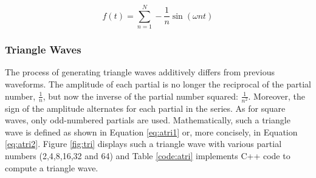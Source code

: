\documentclass[12pt,twoside]{report}
\begin{document}
\begin{equation}
  f(t) = \sum\limits_{n=1}^N -\frac{1}{n} \sin(\omega n t)
  \label{eq:aramp}
\end{equation}

\begin{figure}[h!]

  \TopFloatBoxes

  \begin{floatrow}



  \end{floatrow}

\end{figure}

\subsubsection{Triangle Waves}

The process of generating triangle waves additively differs from previous waveforms. The amplitude of each partial is no longer the reciprocal of the partial number, $\frac{1}{n}$, but now the inverse of the partial number squared: $\frac{1}{n^2}$. Moreover, the sign of the amplitude alternates for each partial in the series. As for square waves, only odd-numbered partials are used. Mathematically, such a triangle wave is defined as shown in Equation \ref{eq:atri1} or, more concisely, in Equation \ref{eq:atri2}. Figure \ref{fig:tri} displays such a triangle wave with various partial numbers (2,4,8,16,32 and 64) and Table \ref{code:atri} implements C++ code to compute a triangle wave.
\end{document}
